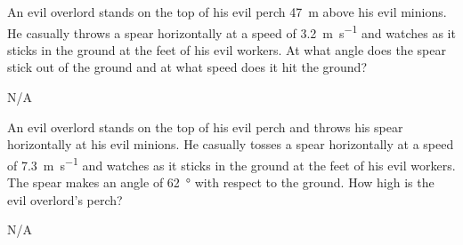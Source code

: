 




\begin{question}[ID=horizontal-A-Q02,topic=projectiles,difficulty=easy]
    An evil overlord stands on the top of his evil perch
        \SI{47}{\meter} above his evil minions.
    He casually throws a spear horizontally at a speed of
        \SI{3.2}{\meter\per\second} and watches as it
        sticks in the ground at the feet of his evil
        workers.
    At what angle does the spear stick out of the ground and
        at what speed does it hit the ground?
\end{question}
\begin{solution}
    N/A
\end{solution}


\begin{question}[ID=horizontal-A-Q03,topic=projectiles,difficulty=A]
    An evil overlord stands on the top of his evil perch and
        throws his spear horizontally at his evil minions.
    He casually tosses a spear horizontally at a speed of
        \SI{7.3}{\meter\per\second} and watches as it sticks
        in the ground at the feet of his evil workers.
    The spear makes an angle of \SI{62}{\degree} with respect
        to the ground.
    How high is the evil overlord's perch?
\end{question}
\begin{solution}
    N/A
\end{solution}


